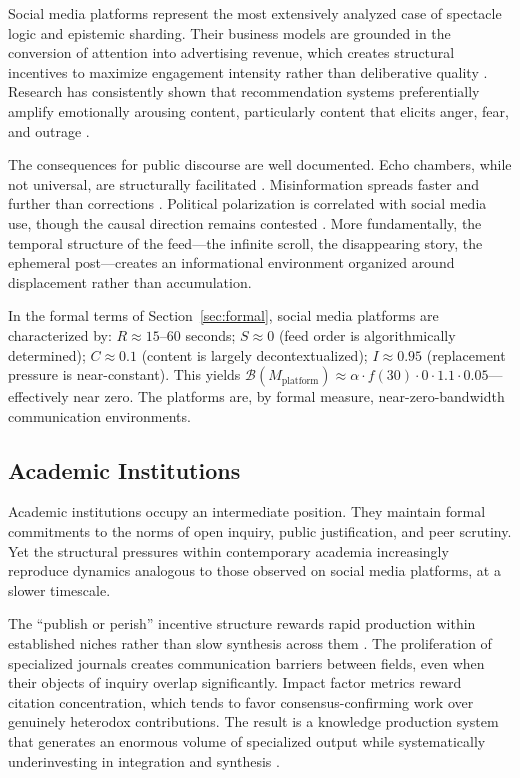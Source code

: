 \documentclass[12pt]{article}
\theoremstyle{definition}
\theoremstyle{plain}
\begin{document}
Social media platforms represent the most extensively analyzed case of spectacle logic and epistemic sharding. Their business models are grounded in the conversion of attention into advertising revenue, which creates structural incentives to maximize engagement intensity rather than deliberative quality \citep{Zuboff2019}. Research has consistently shown that recommendation systems preferentially amplify emotionally arousing content, particularly content that elicits anger, fear, and outrage \citep{Brady2017}.

The consequences for public discourse are well documented. Echo chambers, while not universal, are structurally facilitated \citep{Sunstein2017}. Misinformation spreads faster and further than corrections \citep{Vosoughi2018}. Political polarization is correlated with social media use, though the causal direction remains contested \citep{Settle2018}. More fundamentally, the temporal structure of the feed---the infinite scroll, the disappearing story, the ephemeral post---creates an informational environment organized around displacement rather than accumulation.

In the formal terms of Section~\ref{sec:formal}, social media platforms are characterized by: $R \approx 15\text{--}60$ seconds; $S \approx 0$ (feed order is algorithmically determined); $C \approx 0.1$ (content is largely decontextualized); $I \approx 0.95$ (replacement pressure is near-constant). This yields $\mathcal{B}(M_{\text{platform}}) \approx \alpha \cdot f(30) \cdot 0 \cdot 1.1 \cdot 0.05$---effectively near zero. The platforms are, by formal measure, near-zero-bandwidth communication environments.

\subsection{Academic Institutions}

Academic institutions occupy an intermediate position. They maintain formal commitments to the norms of open inquiry, public justification, and peer scrutiny. Yet the structural pressures within contemporary academia increasingly reproduce dynamics analogous to those observed on social media platforms, at a slower timescale.

The ``publish or perish'' incentive structure rewards rapid production within established niches rather than slow synthesis across them \citep{Smaldino2016}. The proliferation of specialized journals creates communication barriers between fields, even when their objects of inquiry overlap significantly. Impact factor metrics reward citation concentration, which tends to favor consensus-confirming work over genuinely heterodox contributions. The result is a knowledge production system that generates an enormous volume of specialized output while systematically underinvesting in integration and synthesis \citep{Gibbons1994}.
\end{document}
